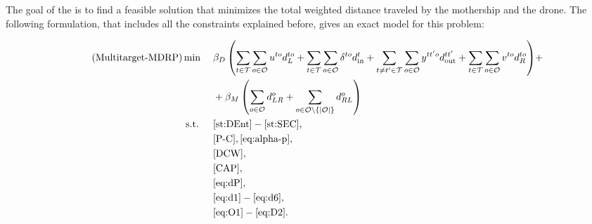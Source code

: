 
\noindent
The goal of the \AMD\xspace is to find a feasible solution that minimizes the total weighted distance traveled by the mothership and the drone. The following formulation, that includes all the constraints explained before, gives an exact model for this problem:

\begin{align*}\label{Multi-MDRP} \tag{Multitarget-MDRP}
\min\quad \; & {\beta_D\left(\sum_{t\in \mathcal T}\sum_{o\in \mathcal O} u^{to}d_L^{to} + \sum_{t\in \mathcal T}\sum_{o\in \mathcal O}\delta^{to}d_{\text{in}}^t + \sum_{t\neq t'\in\mathcal T}\sum_{o\in \mathcal O}y^{tt'o}d_{\text{out}}^{tt'} + \sum_{t\in \mathcal T} \sum_{o\in \mathcal O}v^{to}d_R^{to}\right)} + \\
& + {\beta_M\left(\sum_{o\in\mathcal O}d_{LR}^o+\sum_{o\in \mathcal O\setminus\{|\mathcal O|\}} d_{RL}^o\right)}\\
\mbox{s.t. }\quad & \eqref{st:DEnt}-\eqref{st:SEC},\\
    & \eqref{P-C}, \eqref{eq:alpha-p},\\
	& \eqref{DCW},\\
	& \eqref{CAP}, \\
	& \eqref{eq:dP} \label{dis-zeta-y},\\
	& \eqref{eq:d1}-\eqref{eq:d6},\\
	& \eqref{eq:O1}-\eqref{eq:D2}.
\end{align*}


